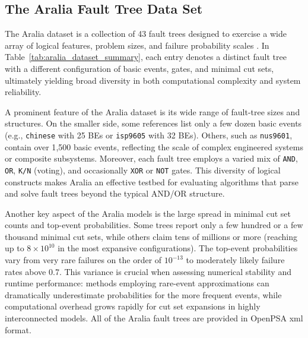\subsection{The Aralia Fault Tree Data Set}
\label{subsec:aralia_dataset}

The Aralia dataset is a collection of 43 fault trees designed to exercise a wide array of logical features, problem sizes, and failure probability scales \cite{earthperson_generic_2021}. In Table~\ref{tab:aralia_dataset_summary}, each entry denotes a distinct fault tree with a different configuration of basic events, gates, and minimal cut sets, ultimately yielding broad diversity in both computational complexity and system reliability.

A prominent feature of the Aralia dataset is its wide range of fault-tree sizes and structures. On the smaller side, some references list only a few dozen basic events (e.g., \texttt{chinese} with 25 BEs or \texttt{isp9605} with 32 BEs). Others, such as \texttt{nus9601}, contain over 1{,}500 basic events, reflecting the scale of complex engineered systems or composite subsystems. Moreover, each fault tree employs a varied mix of \texttt{AND}, \texttt{OR}, \texttt{K/N} (voting), and occasionally \texttt{XOR} or \texttt{NOT} gates. This diversity of logical constructs makes Aralia an effective testbed for evaluating algorithms that parse and solve fault trees beyond the typical AND/OR structure.

Another key aspect of the Aralia models is the large spread in minimal cut set counts and top-event probabilities. Some trees report only a few hundred or a few thousand minimal cut sets, while others claim tens of millions or more (reaching up to \(8\times 10^{10}\) in the most expansive configurations). The top-event probabilities vary from very rare failures on the order of \(10^{-13}\) to moderately likely failure rates above 0.7. This variance is crucial when assessing numerical stability and runtime performance: methods employing rare-event approximations can dramatically underestimate probabilities for the more frequent events, while computational overhead grows rapidly for cut set expansions in highly interconnected models. All of the Aralia fault trees are provided in OpenPSA \acrfull{xml} format.

